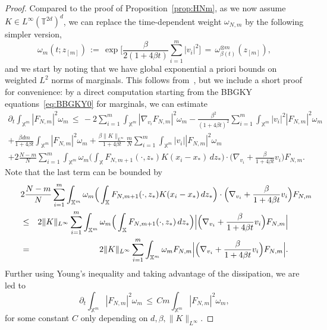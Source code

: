 \documentclass[a4paper,11pt,reqno,noindent]{amsart}
\theoremstyle{plain}
\theoremstyle{definition}
\numberwithin{equation}{section}
\newcommand{\Xd}{\mathbb X}
\newcommand{\T}{\mathbb T}
\begin{document}
\begin{proof}
Compared to the proof of Proposition~\ref{prop:HNm}, as we now assume $K\in L^\infty(\T^{2d})^d$, we can replace the time-dependent weight $\omega_{N,m}$ by the following simpler version,
\begin{equation}\label{eq:def-tildeomem}
\omega_{m}(t;z_{[m]})
\,:=\,\exp\bigg[\frac{\beta}{2(1+4\beta t)}\sum_{i=1}^m|v_i|^2\bigg]\,=\,\omega_{\beta(t)}^{\otimes m}(z_{[m]}),
\end{equation}
and we start by noting that we have global exponential a priori bounds on weighted $L^2$ norms of marginals. This follows from~\cite{BJS-22}, but we include a short proof for convenience: by a direct computation starting from the BBGKY equations~\eqref{eq:BBGKY0} for marginals, we can estimate
\begin{multline*}
\partial_t\int_{\Xd^m} |F_{N,m}|^2\omega_{m}
\,\le\,-2\sum_{i=1}^m\int_{\Xd^m} |\nabla_{v_i}F_{N,m}|^2\omega_{m}
-\frac{\beta^2}{(1+4\beta t)^2}\sum_{i=1}^m\int_{\Xd^m} |v_i|^2|F_{N,m}|^2\omega_{m}\\
+\frac{\beta dm}{1+4\beta t}\int_{\Xd^m} |F_{N,m}|^2 \omega_{m}
+\frac{\beta\|K\|_{L^\infty}}{1+4\beta t}\frac{m}N\sum_{i=1}^m\int_{\Xd^m} |v_i| |F_{N,m}|^2 \omega_{m}\\
+2\frac{N-m}N\sum_{i=1}^m\int_{\Xd^{m}}\omega_{m} \Big(\int_{\Xd} F_{N,m+1}(\cdot,z_*)K(x_i-x_{*})\,dz_*\Big)\cdot\Big(\nabla_{v_i}+\frac{\beta}{1+4\beta t}v_i\Big)F_{N,m}.
\end{multline*}
Note that the last term can be bounded by
\begin{eqnarray*}
\lefteqn{2\frac{N-m}N\sum_{i=1}^m\int_{\Xd^{m}} \omega_{m}\Big(\int_{\Xd} F_{N,m+1}(\cdot,z_*)K(x_i-x_{*})\,dz_*\Big)\cdot\Big(\nabla_{v_i}+\frac{\beta}{1+4\beta t}v_i\Big)F_{N,m}}\\
&\le&2\|K\|_{L^\infty}\sum_{i=1}^m\int_{\Xd^{m}}\omega_{m}\Big(\int_\Xd F_{N,m+1}(\cdot,z_*)\,dz_*\Big)\Big|\Big(\nabla_{v_i}+\frac{\beta}{1+4\beta t}v_i\Big)F_{N,m}\Big|\\
&=&2\|K\|_{L^\infty}\sum_{i=1}^m\int_{\Xd^{m}} \omega_{m}F_{N,m}\Big|\Big(\nabla_{v_i}+\frac{\beta}{1+4\beta t}v_i\Big)F_{N,m}\Big|.
\end{eqnarray*}
Further using Young's inequality and taking advantage of the dissipation, we are led to
\begin{equation*}
\partial_t\int_{\Xd^m} |F_{N,m}|^2\omega_{m}
\,\le\,Cm\int_{\Xd^{m}}|F_{N,m}|^2\omega_{m},
\end{equation*}
for some constant $C$ only depending on $d,\beta,\|K\|_{L^\infty}$.

\end{proof}
\end{document}
